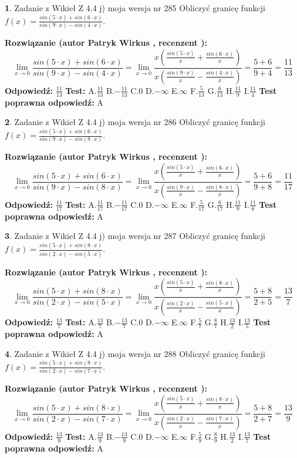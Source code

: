 \documentclass[12pt, a4paper]{article}
\theoremstyle{definition} %
\newtheorem{zad}{}
\newcommand{\zadStart}[1]{\begin{zad}#1\newline}
\newcommand{\zadStop}{\end{zad}}
\newcommand{\rozwStart}[2]{\noindent \textbf{Rozwiązanie (autor #1 , recenzent #2): }\newline}
\newcommand{\rozwStop}{\newline}
\newcommand{\odpStart}{\noindent \textbf{Odpowiedź:}\newline}
\newcommand{\odpStop}{\newline}
\newcommand{\testStart}{\noindent \textbf{Test:}\newline}
\newcommand{\testStop}{\newline}
\newcommand{\kluczStart}{\noindent \textbf{Test poprawna odpowiedź:}\newline}
\newcommand{\kluczStop}{\newline}
\begin{document}
\zadStart{Zadanie z Wikieł Z 4.4 j) moja wersja nr 285}
Obliczyć granicę funkcji $f(x)=\frac{sin(5\cdot x) +sin(6\cdot x)}{sin(9\cdot x) -sin(4\cdot x)}$.
\zadStop
\rozwStart{Patryk Wirkus}{}
$$\lim\limits_{x\to 0}\frac{sin(5\cdot x) +sin(6\cdot x)}{sin(9\cdot x) -sin(4\cdot x)}=\lim\limits_{x\to 0}\frac{x(\frac{sin(5\cdot x)}{x}+\frac{sin(6\cdot x)}{x})}{x(\frac{sin(9\cdot x)}{x}-\frac{sin(4\cdot x)}{x})}=\frac{5+6}{9+4} = \frac{11}{13}$$
\rozwStop
\odpStart
$\frac{11}{13}$
\odpStop
\testStart
A.$\frac{11}{13}$
B.$-\frac{11}{13}$
C.$0$
D.$-\infty$
E.$\infty$
F.$\frac{5}{13}$
G.$\frac{6}{13}$
H.$\frac{11}{9}$
I.$\frac{11}{4}$
\testStop
\kluczStart
A
\kluczStop



\zadStart{Zadanie z Wikieł Z 4.4 j) moja wersja nr 286}
Obliczyć granicę funkcji $f(x)=\frac{sin(5\cdot x) +sin(6\cdot x)}{sin(9\cdot x) -sin(8\cdot x)}$.
\zadStop
\rozwStart{Patryk Wirkus}{}
$$\lim\limits_{x\to 0}\frac{sin(5\cdot x) +sin(6\cdot x)}{sin(9\cdot x) -sin(8\cdot x)}=\lim\limits_{x\to 0}\frac{x(\frac{sin(5\cdot x)}{x}+\frac{sin(6\cdot x)}{x})}{x(\frac{sin(9\cdot x)}{x}-\frac{sin(8\cdot x)}{x})}=\frac{5+6}{9+8} = \frac{11}{17}$$
\rozwStop
\odpStart
$\frac{11}{17}$
\odpStop
\testStart
A.$\frac{11}{17}$
B.$-\frac{11}{17}$
C.$0$
D.$-\infty$
E.$\infty$
F.$\frac{5}{17}$
G.$\frac{6}{17}$
H.$\frac{11}{9}$
I.$\frac{11}{8}$
\testStop
\kluczStart
A
\kluczStop



\zadStart{Zadanie z Wikieł Z 4.4 j) moja wersja nr 287}
Obliczyć granicę funkcji $f(x)=\frac{sin(5\cdot x) +sin(8\cdot x)}{sin(2\cdot x) -sin(5\cdot x)}$.
\zadStop
\rozwStart{Patryk Wirkus}{}
$$\lim\limits_{x\to 0}\frac{sin(5\cdot x) +sin(8\cdot x)}{sin(2\cdot x) -sin(5\cdot x)}=\lim\limits_{x\to 0}\frac{x(\frac{sin(5\cdot x)}{x}+\frac{sin(8\cdot x)}{x})}{x(\frac{sin(2\cdot x)}{x}-\frac{sin(5\cdot x)}{x})}=\frac{5+8}{2+5} = \frac{13}{7}$$
\rozwStop
\odpStart
$\frac{13}{7}$
\odpStop
\testStart
A.$\frac{13}{7}$
B.$-\frac{13}{7}$
C.$0$
D.$-\infty$
E.$\infty$
F.$\frac{5}{7}$
G.$\frac{8}{7}$
H.$\frac{13}{2}$
I.$\frac{13}{5}$
\testStop
\kluczStart
A
\kluczStop



\zadStart{Zadanie z Wikieł Z 4.4 j) moja wersja nr 288}
Obliczyć granicę funkcji $f(x)=\frac{sin(5\cdot x) +sin(8\cdot x)}{sin(2\cdot x) -sin(7\cdot x)}$.
\zadStop
\rozwStart{Patryk Wirkus}{}
$$\lim\limits_{x\to 0}\frac{sin(5\cdot x) +sin(8\cdot x)}{sin(2\cdot x) -sin(7\cdot x)}=\lim\limits_{x\to 0}\frac{x(\frac{sin(5\cdot x)}{x}+\frac{sin(8\cdot x)}{x})}{x(\frac{sin(2\cdot x)}{x}-\frac{sin(7\cdot x)}{x})}=\frac{5+8}{2+7} = \frac{13}{9}$$
\rozwStop
\odpStart
$\frac{13}{9}$
\odpStop
\testStart
A.$\frac{13}{9}$
B.$-\frac{13}{9}$
C.$0$
D.$-\infty$
E.$\infty$
F.$\frac{5}{9}$
G.$\frac{8}{9}$
H.$\frac{13}{2}$
I.$\frac{13}{7}$
\testStop
\kluczStart
A
\kluczStop
\end{document}

